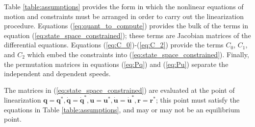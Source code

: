 \documentclass[smallcondensed,final]{svjour3}                     %
\begin{document}
Table \ref{table:assumptions} provides the form in which the nonlinear
equations of motion and constraints must be arranged in order to carry out the
linearization procedure.  Equations (\ref{eq:quant_to_compute}) provides the
bulk of the terms in equation (\ref{eq:state_space_constrained}); these terms
are Jacobian matrices of the differential equations. Equations
(\ref{eq:C_0})-(\ref{eq:C_2}) provide the terms $C_0$, $C_1$, and $C_2$ which
embed the constraints into (\ref{eq:state_space_constrained}). Finally, the
permutation matrices in equations (\ref{eq:Pq}) and (\ref{eq:Pu}) separate the
independent and dependent speeds.

The matrices in (\ref{eq:state_space_constrained}) are evaluated at the point
of linearization $\bm{q}=\bm{q}^*, \bm{\dot{q}}=\bm{\dot{q}}^*,
\bm{u}=\bm{u}^*, \bm{\dot{u}}=\bm{\dot{u}}^*, \bm{r}=\bm{r}^*$; this point must
satisfy the equations in Table \ref{table:assumptions}, and may or may not be
an equilibrium point.
\end{document}
